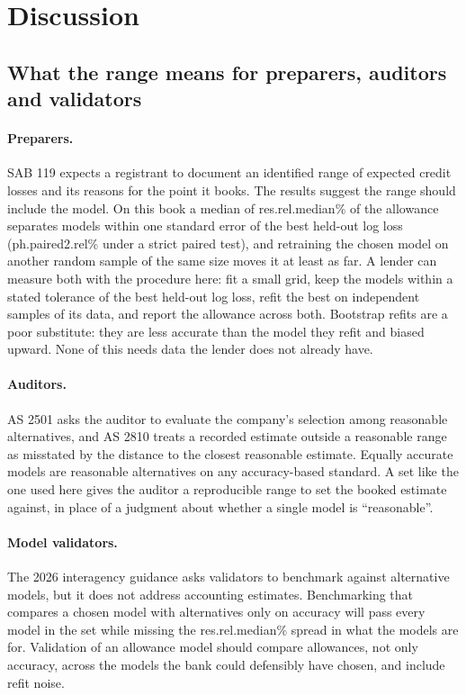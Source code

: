 \section{Discussion}\label{sec:discussion}

\subsection{What the range means for preparers, auditors and validators}

\paragraph{Preparers.} SAB 119 expects a registrant to document an identified
range of expected credit losses and its reasons for the point it books. The
results suggest the range should include the model. On this book a median
of \num{res.rel.median}\% of the allowance separates models within one standard
error of the best held-out log loss (\num{ph.paired2.rel}\% under a strict
paired test), and retraining the chosen model on another random sample of the
same size moves it at least as far. A lender can measure both with the procedure
here: fit a small grid, keep the models within a stated tolerance of the best
held-out log loss, refit the best on independent samples of its data, and
report the allowance across both. Bootstrap refits are a poor substitute:
they are less accurate than the model they refit and biased upward. None of this needs data the lender does not already have.

\paragraph{Auditors.} AS 2501 asks the auditor to evaluate the company's
selection among reasonable alternatives, and AS 2810 treats a recorded
estimate outside a reasonable range as misstated by the distance to the closest
reasonable estimate. Equally accurate models are reasonable alternatives on
any accuracy-based standard. A set like the one used here gives the auditor a
reproducible range to set the booked estimate against, in place of a judgment
about whether a single model is ``reasonable''.

\paragraph{Model validators.} The 2026 interagency guidance asks validators to
benchmark against alternative models, but it does not address accounting
estimates. Benchmarking that compares a chosen model with alternatives only on
accuracy will pass every model in the set while missing the
\num{res.rel.median}\% spread in what the models are for. Validation of an
allowance model should compare allowances, not only accuracy, across the
models the bank could defensibly have chosen, and include refit noise.

